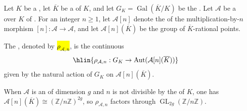 \begin{definition} \label{definition:mod_n_galois_representation_of_a_commutative_group_scheme_over_a_field}
Let $K$ be a , let $\overline{K}$ be a  of $K$, and let $G_K = \operatorname{Gal}(\overline{K}/K)$ be the . Let $\mathcal{A}$ be a  over $K$ of . For an integer $n \geq 1$, let $\mathcal{A}[n]$ denote the  of the multiplication-by-$n$ morphism $[n]: \mathcal{A} \to \mathcal{A}$, and let $\mathcal{A}[n](\overline{K})$ be the group of $\overline{K}$-rational points. 

The , denoted by \hl{$\rho_{\mathcal{A}, n}$}, is the continuous 
$$\hlin{\rho_{\mathcal{A}, n}: G_K \to \operatorname{Aut}(\mathcal{A}[n](\overline{K}))}$$
given by the natural action of $G_K$ on $\mathcal{A}[n](\overline{K})$. 

When $\mathcal{A}$ is an  of dimension $g$ and $n$ is not divisible by the  of $K$, one has $\mathcal{A}[n](\overline{K}) \cong (\mathbb{Z}/n\mathbb{Z})^{2g}$, so $\rho_{\mathcal{A}, n}$ factors through $\operatorname{GL}_{2g}(\mathbb{Z}/n\mathbb{Z})$.
\end{definition}
